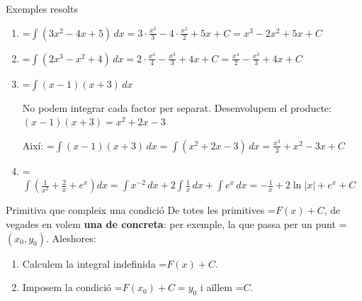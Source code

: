 \documentclass[11pt,a4paper]{article}
\newcommand{\fmm}[1]{\setbox0=\hbox{$#1$}\ifdim\wd0>\linewidth\[#1\]\else\mbox{\box0}\fi}
\begin{document}
  
\begin{fmex}{Exemples resolts}
\begin{enumerate}[label=\textbf{\arabic*.},leftmargin=*]
\item \fmm{\displaystyle\int(3x^2-4x+5)\,dx =\displaystyle 3\cdot\frac{x^3}{3}-4\cdot\frac{x^2}{2}+5x+C = x^3-2x^2+5x+C}
\item \fmm{\displaystyle\int(2x^3-x^2+4)\,dx \displaystyle =2\cdot\frac{x^4}{4}-\frac{x^3}{3}+4x+C=\frac{x^4}{2}-\frac{x^3}{3}+4x+C}
\item \fmm{\displaystyle\int(x-1)(x+3)\,dx}
          

            

No podem integrar cada factor per separat.  Desenvolupem el producte: $(x-1)(x+3)=x^2+2x-3$

\vspace*{0.2cm}

            

Així: \fmm{\displaystyle\int(x-1)(x+3)\,dx=\displaystyle\int(x^2+2x-3)\,dx=\frac{x^3}{3}+x^2-3x+C}
\item \fmm{\displaystyle\int\left(\frac{1}{x^2}+\frac{2}{x}+e^x\right)dx\displaystyle =\int x^{-2}\,dx+2\int\frac1x\,dx+\int e^x\,dx=-\frac1x+2\ln|x|+e^x+C}
\end{enumerate}
\end{fmex}

  
\begin{fmprop}{Primitiva que compleix una condició}
De totes les primitives \fmm{F(x)+C}, de vegades en volem \textbf{una de concreta}: per exemple, la que passa per un punt \fmm{(x_0,y_0)}. Aleshores:

      
\begin{enumerate}
\item Calculem la integral indefinida \fmm{F(x)+C}.
\item Imposem la condició \fmm{F(x_0)+C=y_0} i aïllem \fmm{C}.
\end{enumerate}
\end{fmprop}
\end{document}
